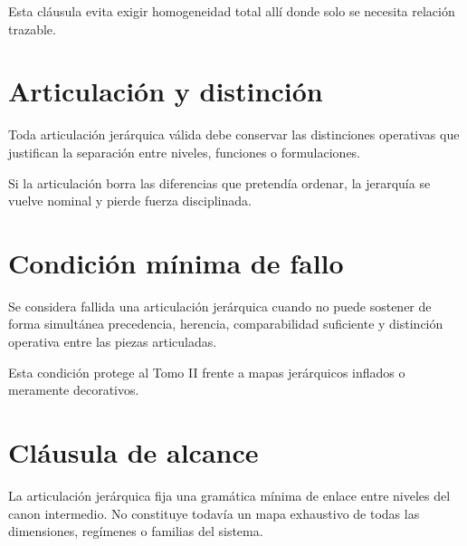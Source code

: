 \begin{observation}
Esta cláusula evita exigir homogeneidad total allí donde solo se necesita relación trazable.
\end{observation}

\section{Articulación y distinción}
\begin{definition}
Toda articulación jerárquica válida debe conservar las distinciones operativas que justifican la separación entre niveles, funciones o formulaciones.
\end{definition}

\begin{observation}
Si la articulación borra las diferencias que pretendía ordenar, la jerarquía se vuelve nominal y pierde fuerza disciplinada.
\end{observation}

\section{Condición mínima de fallo}
\begin{definition}
Se considera fallida una articulación jerárquica cuando no puede sostener de forma simultánea precedencia, herencia, comparabilidad suficiente y distinción operativa entre las piezas articuladas.
\end{definition}

\begin{observation}
Esta condición protege al Tomo II frente a mapas jerárquicos inflados o meramente decorativos.
\end{observation}

\section{Cláusula de alcance}
\begin{observation}
La articulación jerárquica fija una gramática mínima de enlace entre niveles del canon intermedio. No constituye todavía un mapa exhaustivo de todas las dimensiones, regímenes o familias del sistema.
\end{observation}

